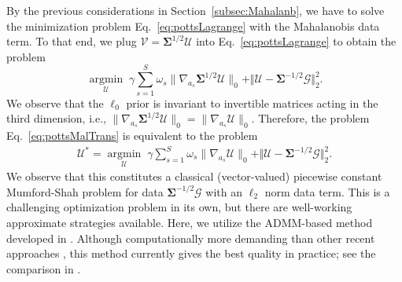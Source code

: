 \documentclass[journal]{IEEEtran}
\newcommand{\Matrix}[1]{\mathbf{#1}}
\newcommand{\Tensor}[1]{\mathcal{#1}}
\newcommand{\argmin}{\operatorname*{argmin}}
\begin{document}
By the previous considerations in Section~\ref{subsec:Mahalanb}, 
we have to solve the minimization problem Eq.~\eqref{eq:pottsLagrange}
with the Mahalanobis data term.
To that end, we plug $\Tensor{V} = \Matrix{\Sigma}^{1/2} \Tensor{U}$
into Eq.~\eqref{eq:pottsLagrange}
to obtain the problem
\begin{equation} \label{eq:pottsMalTrans}
\argmin_{\Tensor{U}} \; \gamma \sum_{ s=1}^S  \omega_s \| \nabla_{a_s} \Matrix{\Sigma}^{1/2} \Tensor{U} \|_0 + \Vert \Tensor{U} -  \Matrix{\Sigma}^{-1/2} \Tensor{G} \Vert^2_2.
\end{equation}
We observe that the $\ell_0$ prior is invariant to invertible matrices acting in the third dimension, i.e.,
$\| \nabla_{a_s} \Matrix{\Sigma}^{1/2} \Tensor{U} \|_0 = \| \nabla_{a_s} \Tensor{U} \|_0.$ 
Therefore, the problem Eq.~\eqref{eq:pottsMalTrans} is equivalent to the problem
\begin{align}\label{eq:pottsMahalanobisPlain}
\Tensor{U}^* = \argmin_{\Tensor{U}} \; \gamma \sum_{s=1}^S  \omega_s \| \nabla_{a_s} \Tensor{U} \|_0 + \Vert \Tensor{U} -  \Matrix{\Sigma}^{-1/2} \Tensor{G}  \Vert^2_2.
\end{align}
We observe that this constitutes
a classical (vector-valued) piecewise constant Mumford-Shah problem 
for data
$\Matrix{\Sigma}^{-1/2} \Tensor{G}$ with an $\ell_2$ norm data term.
This  is a challenging optimization problem in its own,
but there are well-working approximate strategies available.
Here, we utilize the ADMM-based method developed in \cite{storath2014jump, storath2014fast}.
Although computationally more demanding than other recent approaches \cite{xu2011image, cheng2014feature, nguyen2015fast}, this method currently gives
 the best quality in practice; see the comparison in \cite{nguyen2015fast}.
\end{document}
